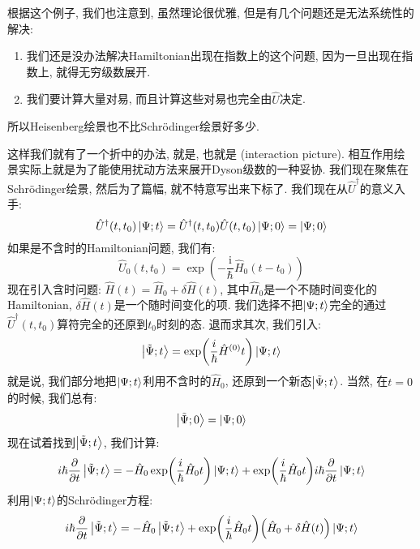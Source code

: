 根据这个例子, 我们也注意到, 虽然理论很优雅, 但是有几个问题还是无法系统性的解决:
\begin{enumerate}
\item 我们还是没办法解决Hamiltonian出现在指数上的这个问题, 因为一旦出现在指数上, 就得无穷级数展开.
\item 我们要计算大量对易, 而且计算这些对易也完全由$\hat{U}$决定.
\end{enumerate}
所以Heisenberg绘景也不比Schrödinger绘景好多少.

这样我们就有了一个折中的办法, 就是, 也就是 (interaction picture).
相互作用绘景实际上就是为了能使用扰动方法来展开Dyson级数的一种妥协.
我们现在聚焦在Schrödinger绘景, 然后为了篇幅, 就不特意写出来下标了.
我们现在从$\hat{U}^\dagger$的意义入手:
\begin{equation}
	\hat{U}^\dagger(t,t_0) \ket{\Psi;t} = \hat{U}^\dagger(t, t_0)\hat{U}(t, t_0) \ket{\Psi;0} = \ket{\Psi;0}
\end{equation}
如果是不含时的Hamiltonian问题, 我们有:
\begin{equation}
	\hat{U}_0(t, t_0) = \exp(-\frac{\mathrm{i}}{\hbar} \hat{H}_0 (t-t_0))
\end{equation}
现在引入含时问题: $\hat{H}(t) = \hat{H}_0 + \delta\hat{H}(t)$, 其中$\hat{H}_0$是一个不随时间变化的Hamiltonian, $\delta\hat{H}(t)$是一个随时间变化的项.
我们选择不把$\ket{\Psi;t}$完全的通过$\hat{U}^\dagger(t,t_0)$算符完全的还原到$t_0$时刻的态.
退而求其次, 我们引入:
\begin{equation}
	\ket{\tilde{\Psi};t} = \exp(\frac{i}{\hbar} \hat{H}^{(0)} t) \ket{\Psi;t}
\end{equation}
就是说, 我们部分地把$\ket{\Psi;t}$利用不含时的$\hat{H}_0$, 还原到一个新态$\ket{\tilde{\Psi};t}$.
当然, 在$t=0$的时候, 我们总有:
\begin{equation}
	\ket{\tilde{\Psi};0} = \ket{{\Psi};0}
\end{equation}
现在试着找到$\ket{\tilde{\Psi};t}$, 我们计算:
\begin{equation}
	i\hbar \pdv{}{t} \ket{\tilde{\Psi};t} = -\hat{H}_0 \exp(\frac{i}{\hbar} \hat{H}_0 t) \ket{{\Psi};t} + \exp(\frac{i}{\hbar} \hat{H}_0 t) i\hbar \pdv{}{t}\ket{{\Psi};t}
\end{equation}
利用$\ket{{\Psi};t}$的Schrödinger方程:
\begin{equation}
	i\hbar \pdv{}{t} \ket{\tilde{\Psi};t} = -\hat{H}_0\ket{\tilde{\Psi};t} + \exp(\frac{i}{\hbar} \hat{H}_0 t) \pqty{\hat{H}_0+\delta\hat{H}(t)}\ket{{\Psi};t}
\end{equation}
